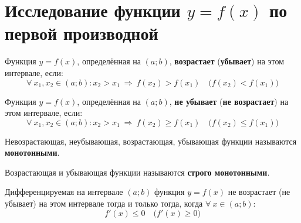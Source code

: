 \section{Исследование функции $y = f(x)$ по первой производной}
\begin{definition}
	Функция $y=f(x)$, определённая на $(a;b)$, \textbf{возрастает} (\textbf{убывает}) на этом интервале, если: \[ \forall\ x_1, x_2 \in (a;b)\colon x_2 > x_1\ \Rightarrow\ f(x_2) > f(x_1)\quad \Big(f(x_2) < f(x_1)\Big) \]
\end{definition}
\begin{definition}
	Функция $y=f(x)$, определённая на $(a;b)$, \textbf{не убывает} (\textbf{не возрастает}) на этом интервале, если:
	\[ \forall\ x_1, x_2 \in (a;b)\colon x_2 > x_1\ \Rightarrow\ f(x_2) \ge f(x_1)\quad \Big(f(x_2) \le f(x_1)\Big) \]
\end{definition}
\begin{definition}
	Невозрастающая, неубывающая, возрастающая, убывающая функции называются \textbf{монотонными}.
\end{definition}
\begin{definition}
	Возрастающая и убывающая функции называются \textbf{строго монотонными}.
\end{definition}
\begin{theorem}
	Дифференцируемая на интервале $(a;b)$ функция $y=f(x)$ не возрастает (не убывает) на этом интервале тогда и только тогда, когда $\forall\ x \in (a;b)\colon$
	\[ f'(x) \le 0\quad \Big(f'(x) \ge 0\Big) \]
\end{theorem}
